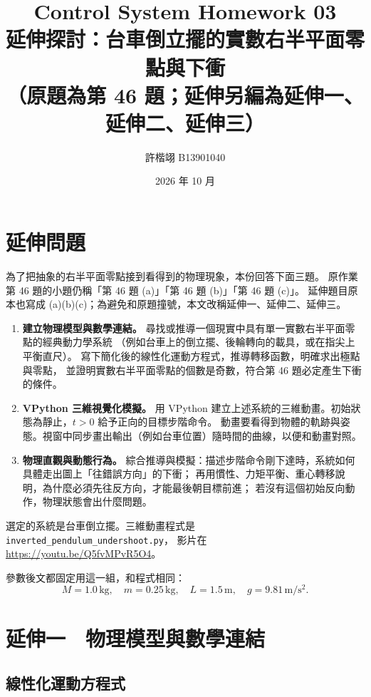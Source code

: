 \documentclass[12pt,a4paper]{article}
\title{\textbf{Control System Homework 03}\\[0.35em]
\large 延伸探討：台車倒立擺的實數右半平面零點與下衝\\[0.35em]
\normalsize （原題為第 46 題；延伸另編為延伸一、延伸二、延伸三）}
\author{許楷翊 \quad B13901040}
\date{2026 年 10 月}
\begin{document}
\maketitle

\section*{延伸問題}

為了把抽象的右半平面零點接到看得到的物理現象，本份回答下面三題。
原作業第 46 題的小題仍稱「第 46 題 (a)」「第 46 題 (b)」「第 46 題 (c)」。
延伸題目原本也寫成 (a)(b)(c)；為避免和原題撞號，本文改稱延伸一、延伸二、延伸三。

\begin{enumerate}
  \item[\textbf{延伸一.}]
  \textbf{建立物理模型與數學連結。}
  尋找或推導一個現實中具有單一實數右半平面零點的經典動力學系統
  （例如台車上的倒立擺、後輪轉向的載具，或在指尖上平衡直尺）。
  寫下簡化後的線性化運動方程式，推導轉移函數，明確求出極點與零點，
  並證明實數右半平面零點的個數是奇數，符合第 46 題必定產生下衝的條件。

  \item[\textbf{延伸二.}]
  \textbf{VPython 三維視覺化模擬。}
  用 VPython 建立上述系統的三維動畫。初始狀態為靜止，\(t>0\) 給予正向的目標步階命令。
  動畫要看得到物體的軌跡與姿態。視窗中同步畫出輸出（例如台車位置）隨時間的曲線，以便和動畫對照。

  \item[\textbf{延伸三.}]
  \textbf{物理直觀與動態行為。}
  綜合推導與模擬：描述步階命令剛下達時，系統如何具體走出圖上「往錯誤方向」的下衝；
  再用慣性、力矩平衡、重心轉移說明，為什麼必須先往反方向，才能最後朝目標前進；
  若沒有這個初始反向動作，物理狀態會出什麼問題。
\end{enumerate}

選定的系統是台車倒立擺。三維動畫程式是 \texttt{inverted\_pendulum\_undershoot.py}，
影片在 \url{https://youtu.be/Q5fvMPvR5O4}。

參數後文都固定用這一組，和程式相同：
\[
  M=1.0\,\mathrm{kg},\quad
  m=0.25\,\mathrm{kg},\quad
  L=1.5\,\mathrm{m},\quad
  g=9.81\,\mathrm{m/s^2}.
\]

\section{延伸一　物理模型與數學連結}

\subsection{線性化運動方程式}
\end{document}
